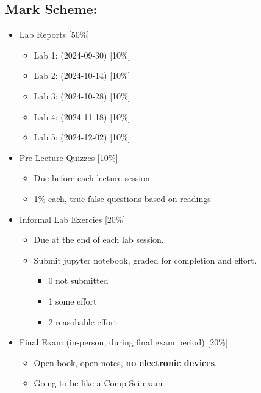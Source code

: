     \subsection{Mark Scheme:}
        \begin{itemize}
            \item Lab Reports [50\%]
            \begin{itemize}
                \item Lab 1: (2024-09-30) [10\%]
                \item Lab 2: (2024-10-14) [10\%]
                \item Lab 3: (2024-10-28) [10\%]
                \item Lab 4: (2024-11-18) [10\%]
                \item Lab 5: (2024-12-02) [10\%]
            \end{itemize}
            \item Pre Lecture Quizzes [10\%]
                \begin{itemize}
                    \item Due before each lecture session
                    \item  1\% each, true false questions based on readings
                \end{itemize}
            \item Informal Lab Exercies [20\%]
                \begin{itemize}
                    \item Due at the end of each lab session. 
                    \item Submit jupyter notebook, graded for completion and effort.
                    \begin{itemize}
                        \item 0 not submitted
                        \item 1 some effort
                        \item 2 reasobable effort
                    \end{itemize}
                \end{itemize}
            \item Final Exam (in-person, during final exam period) [20\%]
                \begin{itemize}    
                    \item Open book, open notes, \textbf{no electronic devices}.
                    \item Going to be like a Comp Sci exam
                \end{itemize}
        \end{itemize}

